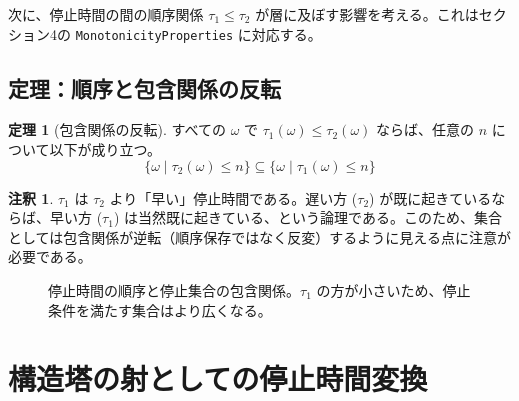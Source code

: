 \documentclass[a4paper,11pt]{ltjsarticle}
\theoremstyle{definition}
\newtheorem{theorem}[definition]{定理}
\newtheorem{remark}[definition]{注釈}
\newcommand{\Tau}{\tau}
\begin{document}
次に、停止時間の間の順序関係 $\Tau_1 \le \Tau_2$ が層に及ぼす影響を考える。これはセクション4の \texttt{MonotonicityProperties} に対応する。

\subsection{定理：順序と包含関係の反転}
\begin{theorem}[包含関係の反転]
すべての $\omega$ で $\Tau_1(\omega) \le \Tau_2(\omega)$ ならば、任意の $n$ について以下が成り立つ。
\[
    \{\omega \mid \Tau_2(\omega) \le n\} \subseteq \{\omega \mid \Tau_1(\omega) \le n\}
\]
\end{theorem}

\begin{remark}
$\Tau_1$ は $\Tau_2$ より「早い」停止時間である。遅い方 ($\Tau_2$) が既に起きているならば、早い方 ($\Tau_1$) は当然既に起きている、という論理である。このため、集合としては包含関係が逆転（順序保存ではなく反変）するように見える点に注意が必要である。
\end{remark}

\begin{figure}[h]
\centering
{}
\caption{停止時間の順序と停止集合の包含関係。$\Tau_1$ の方が小さいため、停止条件を満たす集合はより広くなる。}
\label{fig:monotonicity}
\end{figure}

\section{構造塔の射としての停止時間変換}
\end{document}
